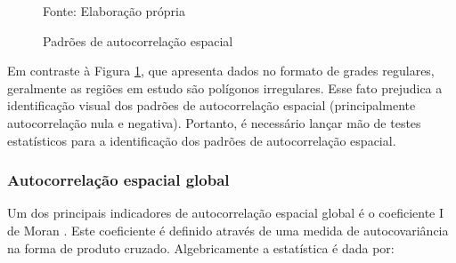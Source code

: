\documentclass[
	12pt,				%
	openright,			%
	oneside,			%
	a4paper,			%
	chapter=TITLE,		%
	section=TITLE,		%
	english,			%
	french,				%
	spanish,			%
	brazil				%
	]{abntex2}
\begin{document}
\begin{figure}[!htb]
	\caption{Padrões de autocorrelação espacial}\label{autocorrelacao}
	\begin{center}
	\end{center}
	\noindent Fonte: Elaboração própria
\end{figure}

Em contraste à Figura \ref{autocorrelacao}, que apresenta dados no formato de grades regulares, geralmente as regiões em estudo são polígonos irregulares. Esse fato  prejudica a identificação visual dos padrões de autocorrelação espacial (principalmente autocorrelação nula e negativa). Portanto, é necessário lançar mão de testes estatísticos para a identificação dos padrões de autocorrelação espacial.

\subsubsection{Autocorrelação espacial global}

Um dos principais indicadores de autocorrelação espacial global é o coeficiente I de Moran \cite{almeida12}. Este coeficiente é definido através de uma medida de autocovariância na forma de produto cruzado. Algebricamente a estatística é dada por:
\end{document}
